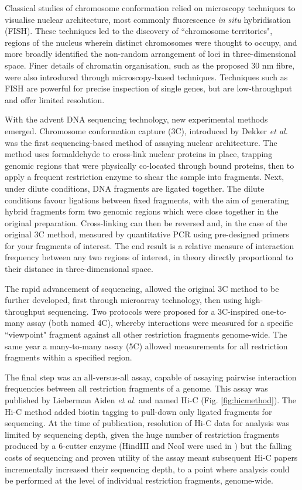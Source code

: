 \documentclass[a4paper,11pt,oneside]{book}
\begin{document}
Classical studies of chromosome conformation relied on microscopy techniques to visualise nuclear architecture, most commonly fluorescence \emph{in situ} hybridisation (FISH). These techniques led to the discovery of ``chromosome territories", regions of the nucleus wherein distinct chromosomes were thought to occupy, and more broadly identified the non-random arrangement of loci in three-dimensional space.\cite{DeWit2012, VanSteensel2010} Finer details of chromatin organisation, such as the proposed 30 nm fibre, were also introduced through microscopy-based techniques. Techniques such as FISH are powerful for precise inspection of single genes, but are low-throughput and offer limited resolution.\cite{DeWit2012}

With the advent DNA sequencing technology, new experimental methods emerged. Chromosome conformation capture (3C), introduced by Dekker \emph{et al.}\cite{Dekker2002} was the first sequencing-based method of assaying nuclear architecture. The method uses formaldehyde to cross-link nuclear proteins in place, trapping genomic regions that were physically co-located through bound proteins, then to apply a frequent restriction enzyme to shear the sample into fragments. Next, under dilute conditions, DNA fragments are ligated together. The dilute conditions favour ligations between fixed fragments, with the aim of generating hybrid fragments form two genomic regions which were close together in the original preparation. Cross-linking can then be reversed and, in the case of the original 3C method, measured by quantitative PCR using pre-designed primers for your fragments of interest. The end result is a relative measure of interaction frequency between any two regions of interest, in theory directly proportional to their distance in three-dimensional space.

The rapid advancement of sequencing, allowed the original 3C method to be further developed, first through microarray technology, then using high-throughput sequencing. Two protocols were proposed for a 3C-inspired one-to-many assay\cite{Zhao2006, Simonis2006} (both named 4C), whereby interactions were measured for a specific ``viewpoint" fragment against all other restriction fragments genome-wide. The same year a many-to-many assay (5C) allowed measurements for all restriction fragments within a specified region.\cite{Dostie2006} 

The final step was an all-versus-all assay, capable of assaying pairwise interaction frequencies between all restriction fragments of a genome. This assay was published by Lieberman Aiden \emph{et al.}\cite{Lieberman2009} and named Hi-C (Fig. \ref{fig:hicmethod}). The Hi-C method added biotin tagging to pull-down only ligated fragments for sequencing. At the time of publication, resolution of Hi-C data for analysis was limited by sequencing depth, given the huge number of restriction fragments produced by a 6-cutter enzyme (HindIII and NcoI were used in \cite{Lieberman2009}) but the falling costs of sequencing and proven utility of the assay meant subsequent Hi-C papers incrementally increased their sequencing depth, to a point where analysis could be performed at the level of individual restriction fragments, genome-wide.\cite{Dixon2012,  Selvaraj2013a, Jin2013, Rao2014}
\end{document}
